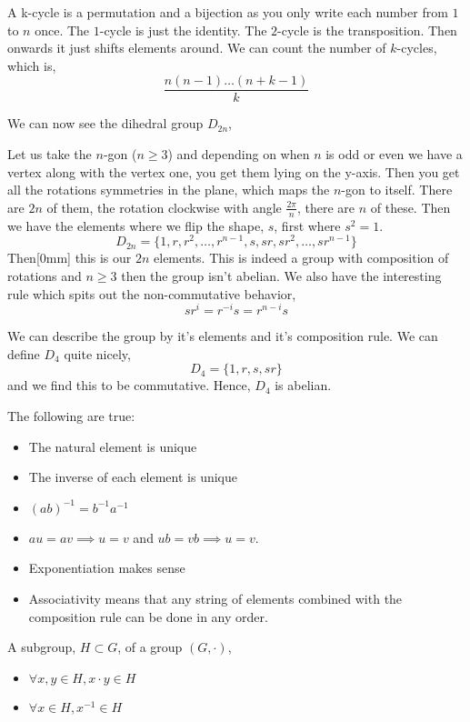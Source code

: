 A k-cycle is a permutation and a bijection as you only write each number from $1$ to $n$ once. The $1$-cycle is just the identity. The $2$-cycle is the transposition. Then onwards it just shifts elements around. We can count the number of $k$-cycles, which is,
$$ \frac{n(n-1) \dots (n + k -1)}{k} $$

We can now see the dihedral group $D_{2n}$,
\begin{ndefi}
  Let us take the $n$-gon ($n \ge 3$) and depending on when $n$ is odd or even we have a vertex along with the vertex one, you get them lying on the y-axis. Then you get all the rotations symmetries in the plane, which maps the $n$-gon to itself. There are $2n$ of them, the rotation clockwise with angle $\frac{2\pi}{n}$, there are $n$ of these. Then we have the elements where we flip the shape, $s$, first where $s^2 = 1$.
  $$ D_{2n} = \{1, r, r^2, \dots, r^{n-1}, s, sr, sr^2, \dots, sr^{n-1} \} $$
  Then[0mm] this is our $2n$ elements. This is indeed a group with composition of rotations and $n \ge 3$ then the group isn't abelian. We also have the interesting rule which spits out the non-commutative behavior,
  $$ sr^i = r^{-i}s = r^{n-i}s $$
\end{ndefi}

We can describe the group by it's elements and it's composition rule. We can define $D_4$ quite nicely,
$$ D_{4} = \{1, r, s, sr\} $$
and we find this to be commutative. Hence, $D_4$ is abelian.

\begin{nlemma}
  The following are true:
  \begin{itemize}
    \item The natural element is unique
    \item The inverse of each element is unique
    \item $(ab)^{-1} = b^{-1}a^{-1}$
    \item $au = av \implies u = v$ and $ub = vb \implies u = v$.
    \item Exponentiation makes sense
    \item Associativity means that any string of elements combined with the composition rule can be done in any order.
  \end{itemize}
\end{nlemma}


\begin{ndefi}[Subgroup]
  A subgroup, $H \subset G$, of a group $(G, \cdot)$,
  \begin{itemize}
    \item $\forall x, y \in H, x \cdot y \in H$
    \item $\forall x \in H, x^{-1} \in H$
  \end{itemize}
\end{ndefi}

